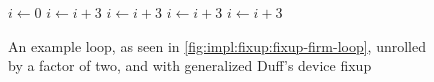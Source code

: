 \begin{figure}[H]
	\begin{algorithmic}
		\State $i \gets 0$
			\State {}
			\State $i \gets i + 3$
			\State {}
			\State $i \gets i + 3$
		\EndWhile
				\State {}
				\State $i \gets i + 3$
			\EndCase
				\State {}
				\State $i \gets i + 3$
			\EndCase
		\EndSwitch
	\end{algorithmic}
	\caption{An example loop, as seen in \cref{fig:impl:fixup:fixup-firm-loop}, unrolled by a factor of two, and with generalized Duff's device fixup}\label{fig:impl:fixup:duff:fixup-firm-comp}
\end{figure}